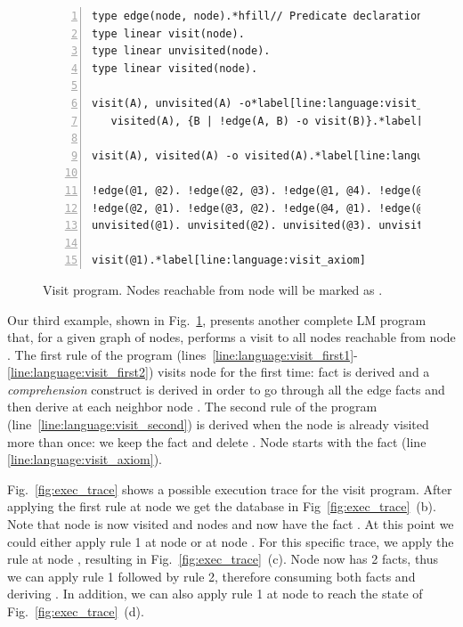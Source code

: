 
\begin{figure}[h!]
\begin{Verbatim}[numbers=left,fontsize=\codesize,commandchars=\*\[\]]
type edge(node, node).*hfill// Predicate declaration.
type linear visit(node).
type linear unvisited(node).
type linear visited(node).

visit(A), unvisited(A) -o*label[line:language:visit_first1]*hfill // Rule 1: visit node.
   visited(A), {B | !edge(A, B) -o visit(B)}.*label[line:language:visit_first2]*label[line:language:visit_comprehension]

visit(A), visited(A) -o visited(A).*label[line:language:visit_second]*hfill // Rule 2: node already visited.

!edge(@1, @2). !edge(@2, @3). !edge(@1, @4). !edge(@2, @4).*hfill// Initial facts.
!edge(@2, @1). !edge(@3, @2). !edge(@4, @1). !edge(@4, @2).
unvisited(@1). unvisited(@2). unvisited(@3). unvisited(@4).

visit(@1).*label[line:language:visit_axiom]
\end{Verbatim}
  \caption{Visit program. Nodes reachable from node  will be marked
     as .}
  \label{code:language:visit}
\end{figure}

Our third example, shown in Fig.~\ref{code:language:visit}, presents another
complete LM program that, for a given graph of nodes, performs a visit to all
nodes reachable from node . The first rule of the program
(lines~\ref{line:language:visit_first1}-\ref{line:language:visit_first2}) visits
node  for the first time: fact  is derived and a
\emph{comprehension} construct is derived in order to go through all the edge
facts and then derive  at each neighbor node . The second
rule of the program (line~\ref{line:language:visit_second}) is derived when the
node is already visited more than once: we keep the  fact and
delete . Node  starts with the  fact (line
\ref{line:language:visit_axiom}).

Fig.~\ref{fig:exec_trace} shows a possible execution trace for the visit
program. After applying the first rule at node  we get the database in
Fig~\ref{fig:exec_trace}~(b).  Note that node  is now visited and nodes
 and  now have the fact . At this point we could
either apply rule 1 at node  or at node .  For this specific
trace, we apply the rule at node , resulting in
Fig.~\ref{fig:exec_trace}~(c). Node  now has 2  facts, thus
we can apply rule 1 followed by rule 2, therefore consuming both 
facts and deriving . In addition, we can also apply rule 1 at node
 to reach the state of Fig.~\ref{fig:exec_trace}~(d).

